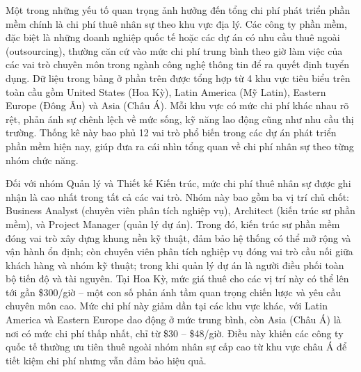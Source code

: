 \renewcommand{\labelitemi}{--}    
    \begin{flushleft}
        \hspace*{0.8cm}Một trong những yếu tố quan trọng ảnh hưởng đến tổng chi phí phát triển phần mềm chính là chi phí thuê nhân sự theo khu vực địa lý. Các công ty phần mềm, đặc biệt là những doanh nghiệp quốc tế hoặc các dự án có nhu cầu thuê ngoài (outsourcing), thường căn cứ vào mức chi phí trung bình theo giờ làm việc của các vai trò chuyên môn trong ngành công nghệ thông tin để ra quyết định tuyển dụng. Dữ liệu trong bảng ở phần trên được tổng hợp từ 4 khu vực tiêu biểu trên toàn cầu gồm United States (Hoa Kỳ), Latin America (Mỹ Latin), Eastern Europe (Đông Âu) và Asia (Châu Á). Mỗi khu vực có mức chi phí khác nhau rõ rệt, phản ánh sự chênh lệch về mức sống, kỹ năng lao động cũng như nhu cầu thị trường. Thống kê này bao phủ 12 vai trò phổ biến trong các dự án phát triển phần mềm hiện nay, giúp đưa ra cái nhìn tổng quan về chi phí nhân sự theo từng nhóm chức năng.
    \end{flushleft}

    \begin{flushleft}
      \hspace*{0.8cm}Đối với nhóm Quản lý và Thiết kế Kiến trúc, mức chi phí thuê nhân sự được ghi nhận là cao nhất trong tất cả các vai trò. Nhóm này bao gồm ba vị trí chủ chốt: Business Analyst (chuyên viên phân tích nghiệp vụ), Architect (kiến trúc sư phần mềm), và Project Manager (quản lý dự án). Trong đó, kiến trúc sư phần mềm đóng vai trò xây dựng khung nền kỹ thuật, đảm bảo hệ thống có thể mở rộng và vận hành ổn định; còn chuyên viên phân tích nghiệp vụ đóng vai trò cầu nối giữa khách hàng và nhóm kỹ thuật; trong khi quản lý dự án là người điều phối toàn bộ tiến độ và tài nguyên. Tại Hoa Kỳ, mức giá thuê cho các vị trí này có thể lên tới gần \$300/giờ – một con số phản ánh tầm quan trọng chiến lược và yêu cầu chuyên môn cao. Mức chi phí này giảm dần tại các khu vực khác, với Latin America và Eastern Europe dao động ở mức trung bình, còn Asia (Châu Á) là nơi có mức chi phí thấp nhất, chỉ từ \$30 – \$48/giờ. Điều này khiến các công ty quốc tế thường ưu tiên thuê ngoài nhóm nhân sự cấp cao từ khu vực châu Á để tiết kiệm chi phí nhưng vẫn đảm bảo hiệu quả.
    \end{flushleft}

